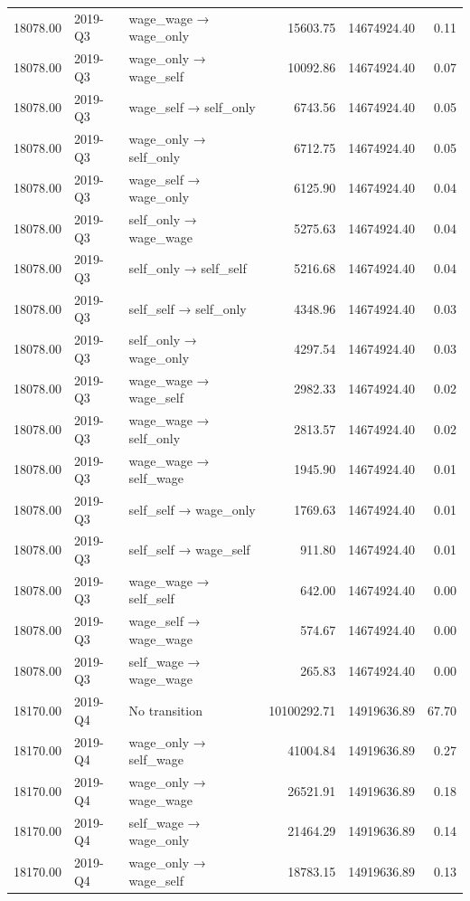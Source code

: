 \begin{table}[ht]
{\begin{tabular}{rllrrr}
  18078.00 & 2019-Q3 & wage\_wage → wage\_only & 15603.75 & 14674924.40 & 0.11 \\ 
  18078.00 & 2019-Q3 & wage\_only → wage\_self & 10092.86 & 14674924.40 & 0.07 \\ 
  18078.00 & 2019-Q3 & wage\_self → self\_only & 6743.56 & 14674924.40 & 0.05 \\ 
  18078.00 & 2019-Q3 & wage\_only → self\_only & 6712.75 & 14674924.40 & 0.05 \\ 
  18078.00 & 2019-Q3 & wage\_self → wage\_only & 6125.90 & 14674924.40 & 0.04 \\ 
  18078.00 & 2019-Q3 & self\_only → wage\_wage & 5275.63 & 14674924.40 & 0.04 \\ 
  18078.00 & 2019-Q3 & self\_only → self\_self & 5216.68 & 14674924.40 & 0.04 \\ 
  18078.00 & 2019-Q3 & self\_self → self\_only & 4348.96 & 14674924.40 & 0.03 \\ 
  18078.00 & 2019-Q3 & self\_only → wage\_only & 4297.54 & 14674924.40 & 0.03 \\ 
  18078.00 & 2019-Q3 & wage\_wage → wage\_self & 2982.33 & 14674924.40 & 0.02 \\ 
  18078.00 & 2019-Q3 & wage\_wage → self\_only & 2813.57 & 14674924.40 & 0.02 \\ 
  18078.00 & 2019-Q3 & wage\_wage → self\_wage & 1945.90 & 14674924.40 & 0.01 \\ 
  18078.00 & 2019-Q3 & self\_self → wage\_only & 1769.63 & 14674924.40 & 0.01 \\ 
  18078.00 & 2019-Q3 & self\_self → wage\_self & 911.80 & 14674924.40 & 0.01 \\ 
  18078.00 & 2019-Q3 & wage\_wage → self\_self & 642.00 & 14674924.40 & 0.00 \\ 
  18078.00 & 2019-Q3 & wage\_self → wage\_wage & 574.67 & 14674924.40 & 0.00 \\ 
  18078.00 & 2019-Q3 & self\_wage → wage\_wage & 265.83 & 14674924.40 & 0.00 \\ 
  18170.00 & 2019-Q4 & No transition & 10100292.71 & 14919636.89 & 67.70 \\ 
  18170.00 & 2019-Q4 & wage\_only → self\_wage & 41004.84 & 14919636.89 & 0.27 \\ 
  18170.00 & 2019-Q4 & wage\_only → wage\_wage & 26521.91 & 14919636.89 & 0.18 \\ 
  18170.00 & 2019-Q4 & self\_wage → wage\_only & 21464.29 & 14919636.89 & 0.14 \\ 
  18170.00 & 2019-Q4 & wage\_only → wage\_self & 18783.15 & 14919636.89 & 0.13 \\ 

\end{tabular}}
\end{table}
